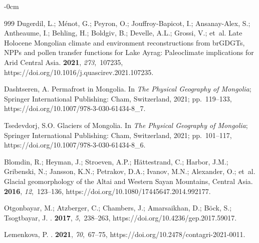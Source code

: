 \documentclass[geosciences,article,accept,pdftex,oneauthor]{Definitions/mdpi}
\begin{document}
\begin{adjustwidth}{-\extralength}{0cm}
\begin{thebibliography}{999}
Dugerdil, L.; Ménot, G.; Peyron, O.; Jouffroy-Bapicot, I.; Ansanay-Alex, S.;
  Antheaume, I.; Behling, H.; Boldgiv, B.; Develle, A.L.; Grossi, V.;  et~al.
\newblock Late Holocene Mongolian climate and environment reconstructions from
  brGDGTs, NPPs and pollen transfer functions for Lake Ayrag: Paleoclimate
  implications for Arid Central Asia.
 {\bf 2021}, {\em 273},~107235, https://doi.org/10.1016/j.quascirev.2021.107235.

Dashtseren, A. Permafrost in Mongolia.
\newblock In {\em The Physical Geography of Mongolia}; Springer International
  Publishing: Cham, Switzerland,  2021; pp.~119--133, https://doi.org/10.1007/978-3-030-61434-8\_7.

Tsedevdorj, S.O. Glaciers of Mongolia.
\newblock In {\em The Physical Geography of Mongolia}; Springer International
  Publishing: Cham, Switzerland,  2021; pp.~101--117, https://doi.org/10.1007/978-3-030-61434-8\_6.

Blomdin, R.; Heyman, J.; Stroeven, A.P.; Hättestrand, C.; Harbor, J.M.;
  Gribenski, N.; Jansson, K.N.; Petrakov, D.A.; Ivanov, M.N.; Alexander, O.;
  et~al.
\newblock Glacial geomorphology of the Altai and Western Sayan Mountains,
  Central Asia.
 {\bf 2016}, {\em 12},~123--136, https://doi.org/10.1080/17445647.2014.992177.

Otgonbayar, M.; Atzberger, C.; Chambers, J.; Amarsaikhan, D.; Böck, S.;
  Tsogtbayar, J.
.
 {\bf 2017},
  {\em 5},~238--263, https://doi.org/10.4236/gep.2017.59017.

Lemenkova, P.
.
 {\bf 2021}, {\em 70},~67--75, https://doi.org/10.2478/contagri-2021-0011.


\end{thebibliography}
\end{adjustwidth}
\end{document}

